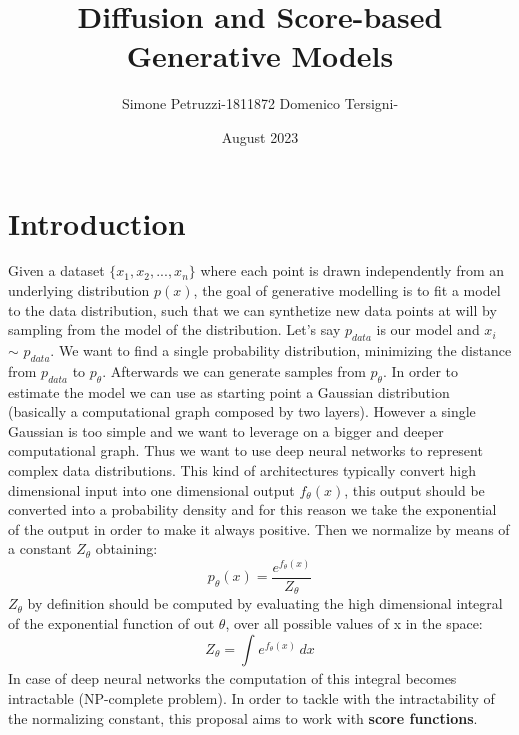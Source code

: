 \documentclass{article}
\title{Diffusion and Score-based Generative Models}
\author{Simone Petruzzi-1811872 Domenico Tersigni-}
\date{August 2023}
\begin{document}
   \maketitle
   \section{Introduction}
	Given a dataset $\{ x_1,x_2,...,x_n \}$ where each point is drawn independently from an underlying distribution $p(x)$, the goal of generative modelling is to fit a model to the data distribution, such that we can synthetize new data points at will by sampling from the model of the distribution.\newline
	Let's say $p_{data}$ is our model and $x_i$ $\sim$ $p_{data}$. We want to find a single probability distribution, minimizing the distance from $p_{data}$ to $p_{\theta}$. Afterwards we can generate samples from $p_{\theta}$. In order to estimate the model we can use as starting point a Gaussian distribution (basically a computational graph composed by two layers). However a single Gaussian is too simple and we want to leverage on a bigger and deeper computational graph. Thus we want to use deep neural networks to represent complex data distributions. This kind of architectures typically convert high dimensional input into one dimensional output $f_{\theta}(x)$, this output should be converted into a probability density and for this reason we take the exponential of the output in order to make it always positive. Then we normalize by means of a constant $Z_{\theta}$ obtaining:\newline
	\begin{equation}
	p_{\theta}(x) = \frac{e^{f_{\theta}(x)}}{Z_{\theta}}
	\end{equation}
	$Z_{\theta}$ by definition should be computed by evaluating the high dimensional integral of the exponential function of out $\theta$, over all possible values of x in the space:
	\begin{equation}
	Z_{\theta}= \int_{}^{} e^{f_{\theta}(x)} \,dx 
	\end{equation}
	In case of deep neural networks the computation of this integral becomes intractable (NP-complete problem). In order to tackle with the intractability of the normalizing constant, this proposal aims to work with \textbf{score functions}.
	\newpage
\end{document}
